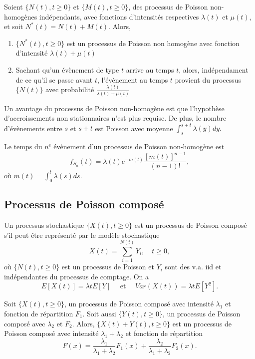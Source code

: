 \begin{proposition}{}{}
	Soient $\{N(t), t \geq 0\}$ et $\{M(t), t\geq 0\}$, des processus de Poisson non-homogènes indépendants, avec fonctions d'intensités respectives $\lambda(t)$ et $\mu(t)$, et soit $N^*(t) = N(t) + M(t)$. Alors, 
	\begin{enumerate}
		\item $\{N^*(t), t\geq 0\}$ est un processus de Poisson non homogène avec fonction d'intensité $\lambda(t) + \mu(t)$
		\item Sachant qu'un évènement de type $t$ arrive au temps $t$, alors, indépendament de ce qu'il se passe avant $t$, l'évènement au temps $t$ provient du processus $\{N(t)\}$ avec probabilité $\frac{\lambda(t)}{\lambda(t) + \mu(t)}$
	\end{enumerate}
\end{proposition}


Un avantage du processus de Poisson non-homogène est que l'hypothèse d'accroissements non stationnaires n'est plus requise. De plus, le nombre d'évènements entre $s$ et $s + t$ est Poisson avec moyenne $\int_{s}^{s+ t}\lambda(y) dy.$

\begin{definition}{}{}
	Le temps du $n^\text{e}$ évènement d'un processus de Poisson non-homogène est 
	$$f_{S_n}(t)= \lambda(t) e^{-m(t)}\frac{[m(t)]^{n-1}}{(n-1)!},$$
	où $m(t) = \int_{0}^{t}\lambda(s) ds.$
\end{definition}

\subsection{Processus de Poisson composé}

Un processus stochastique $\{X(t), t\geq 0\}$ est un processus de Poisson composé s'il peut être représenté par le modèle stochastique 
$$X(t)= \sum_{i = 1}^{N(t)}Y_i, \quad t\geq 0,$$
où $\{N(t), t \geq 0\}$ est un processus de Poisson et $Y_i$ sont des v.a. iid et indépendantes du processus de comptage. On a 
$$E[X(t)] = \lambda t E[Y] \quad \text{ et } \quad Var(X(t)) = \lambda t E[Y^2].$$

\begin{propriete}{}{}
	Soit $\{X(t), t \geq 0\}$, un processus de Poisson composé avec intensité $\lambda_1$ et fonction de répartition $F_1$. Soit aussi $\{Y(t), t \geq 0\}$, un processus de Poisson composé avec $\lambda_2$ et $F_2$. Alors, $\{X(t) + Y(t),t\geq 0\}$ est un processus de Poisson composé avec intensité $\lambda_1 + \lambda_2$ et fonction de répartition
	$$F(x) = \frac{\lambda_1}{\lambda_1 + \lambda_2} F_1(x) + \frac{\lambda_2}{\lambda_1 + \lambda_2} F_2(x).$$
\end{propriete}

